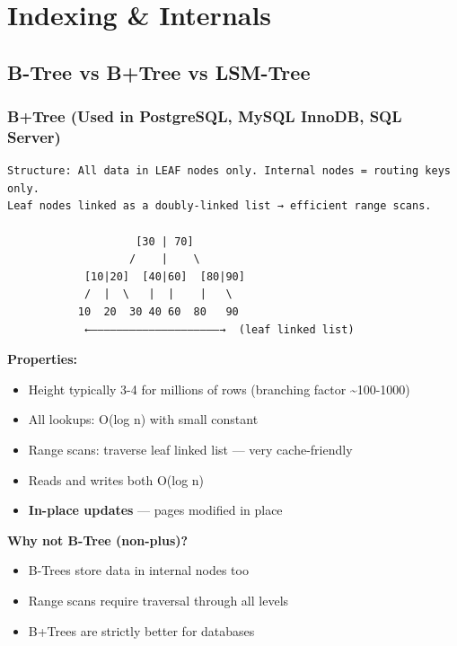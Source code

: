 \documentclass[11pt]{article}
\providecommand{\tightlist}{\setlength{\itemsep}{1pt}\setlength{\parskip}{0pt}}
\begin{document}
\section{Indexing \& Internals}\label{indexing--internals}

\subsection{B-Tree vs B+Tree vs LSM-Tree}\label{b-tree-vs-btree-vs-lsm-tree}


\subsubsection{B+Tree (Used in PostgreSQL, MySQL InnoDB, SQL Server)}\label{btree-used-in-postgresql-mysql-innodb-sql-server}

\setcodelang{}

\begin{verbatim}
Structure: All data in LEAF nodes only. Internal nodes = routing keys only.
Leaf nodes linked as a doubly-linked list → efficient range scans.

                    [30 | 70]
                   /    |    \
            [10|20]  [40|60]  [80|90]
            /  |  \   |  |    |   \
           10  20  30 40 60  80   90
            ←————————————————————→  (leaf linked list)
\end{verbatim}

\textbf{Properties:}

\begin{itemize}
\tightlist
\item
  Height typically 3-4 for millions of rows (branching factor \textasciitilde100-1000)
\item
  All lookups: O(log n) with small constant
\item
  Range scans: traverse leaf linked list --- very cache-friendly
\item
  Reads and writes both O(log n)
\item
  \textbf{In-place updates} --- pages modified in place
\end{itemize}

\textbf{Why not B-Tree (non-plus)?}

\begin{itemize}
\tightlist
\item
  B-Trees store data in internal nodes too
\item
  Range scans require traversal through all levels
\item
  B+Trees are strictly better for databases
\end{itemize}
\end{document}
